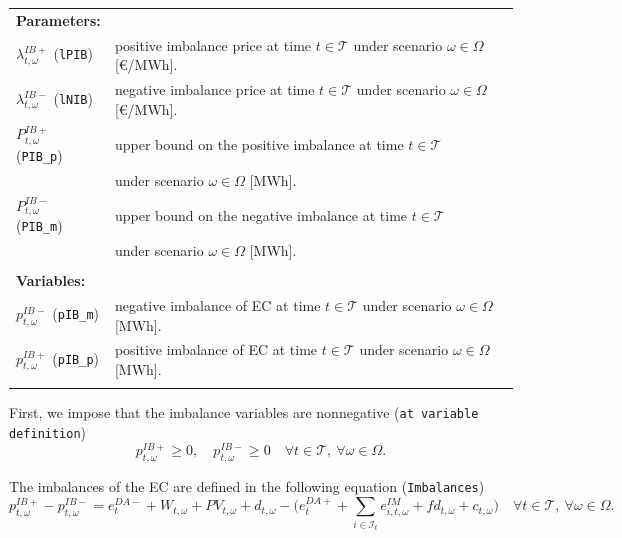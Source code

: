 \documentclass{article}
\begin{document}
\begin{tabularx}{\textwidth}{l l}
    \textbf{Parameters:} \\
    $\lambda^{IB+}_{t, \omega}$ (\verb|lPIB|) & positive imbalance price at time $t \in \mathcal{T}$ under scenario $\omega \in \Omega$ [\euro/MWh]. \\
	$\lambda^{IB-}_{t, \omega}$ (\verb|lNIB|) & negative imbalance price at time $t \in \mathcal{T}$ under scenario $\omega \in \Omega$ [\euro/MWh]. \\
    $P^{IB+}_{t, \omega}$ (\verb|PIB_p|) & upper bound on the positive imbalance at time $t \in \mathcal{T}$ \\
    & under scenario $\omega \in \Omega$ [MWh]. \\
	$P^{IB-}_{t, \omega}$ (\verb|PIB_m|) & upper bound on the negative imbalance at time $t \in \mathcal{T}$ \\ 
	& under scenario $\omega \in \Omega$ [MWh]. \\
    \\ 
       
    \textbf{Variables:} \\
    $p_{t, \omega}^{IB-}$ (\verb|pIB_m|) & negative imbalance of EC at time $t \in \mathcal{T}$ under scenario $\omega \in \Omega$ [MWh].	\\
	$p_{t, \omega}^{IB+}$ (\verb|pIB_p|) & positive imbalance of EC at time $t \in \mathcal{T}$ under scenario $\omega \in \Omega$ [MWh].	\\ 
    \\
\end{tabularx}

First, we impose that the imbalance variables are nonnegative (\verb|at variable definition|)
\begin{equation} \label{EQ:IBVarDef}
    p_{t, \omega}^{IB+} \geq 0, \quad p_{t, \omega}^{IB-} \geq 0 \quad \forall t \in \mathcal{T}, \ \forall \omega \in \Omega.
\end{equation}

The imbalances of the EC are defined in the following equation (\verb|Imbalances|)
\begin{equation} \label{EQ:IBDef}
    p^{IB+}_{t, \omega} - p^{IB-}_{t, \omega} = e^{DA-}_{t} + W_{t, \omega} + PV_{t, \omega} + d_{t, \omega} - \Big (e^{DA+}_{t} + \sum_{i \in \mathcal{I}_t} e^{IM}_{i, t, \omega} + fd_{t, \omega} + c_{t, \omega} \Big ) \quad \forall t \in \mathcal{T}, \ \forall \omega \in \Omega.
\end{equation}
\end{document}
